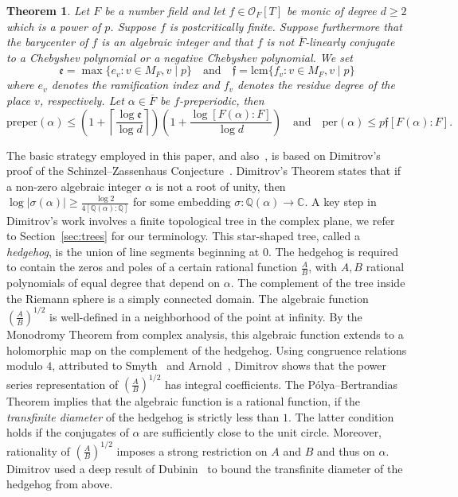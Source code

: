\documentclass[12pt,oneside,a4]{amsart}
\newcommand{\IC}{\mathbb{C}}
\newcommand{\IQ}{\mathbb{Q}}
\newcommand{\cO}{\mathcal{O}}
\newcounter{maincounter}
\numberwithin{maincounter}{section}
\numberwithin{equation}{section}
\newtheorem{theorem}[maincounter]{Theorem}
\begin{document}
\begin{theorem}
  \label{thm:intropreper}
  Let $F$ be a number field
  and let $f\in \cO_F[T]$ be monic of degree $d\ge 2$ which is a
  power of $p$.
  Suppose $f$ is postcritically finite. Suppose furthermore that the
  barycenter of $f$ is an algebraic integer and that $f$ is not
  $\overline F$-linearly conjugate to a Chebyshev polynomial or a
  negative Chebyshev polynomial.
  We set
  \begin{equation*}
    \mathfrak{e} = \max\{ e_v : v\in M_F, v\mid p\}\quad\text{and}\quad
    \mathfrak{f} =\mathrm{lcm}\{ f_v : v\in M_F, v\mid p\}
  \end{equation*}
   where $e_v$ denotes
  the ramification index and 
  $f_v$ denotes the residue degree of the place $v$, respectively.
  Let $\alpha\in \overline F$ be $f$-preperiodic, then 
  \begin{equation*}
    \mathrm{preper}(\alpha)\le
    \left(1+\left\lceil \frac{\log\mathfrak{e}}{\log d}\right\rceil\right)\left(1+\frac{\log[F(\alpha):F]}{\log
      d}\right)
    \quad\text{and}\quad
    \mathrm{per}(\alpha)\le p\mathfrak f[F(\alpha):F]. 
  \end{equation*}
\end{theorem}

The basic strategy employed in this paper, and
also~\cite{hs:2021lower}, is based on Dimitrov's proof of
the Schinzel--Zassenhaus Conjecture~\cite{dimitrov:SZ}. Dimitrov's
Theorem states that if a non-zero algebraic integer $\alpha$ is not a
root of unity, then $\log |\sigma(\alpha)|\ge \frac{\log 2}{4[\IQ(\alpha):\IQ]}$
for some embedding $\sigma\colon \IQ(\alpha)\rightarrow\IC$. 
A key step in Dimitrov's work  involves a finite topological tree in
the complex plane, we refer to Section~\ref{sec:trees} for our
terminology. 
This star-shaped tree, called a \textit{hedgehog}, is the
 union of line segments beginning at
$0$.
The hedgehog is required to contain the zeros and
poles of a certain rational function $\frac AB$, with $A,B$ rational
polynomials of equal degree that depend on $\alpha$.
The complement of the tree inside the
Riemann sphere is a simply connected domain. The algebraic function
$(\frac AB)^{1/2}$ is well-defined in a neighborhood of the point at
infinity. By the Monodromy Theorem  from complex analysis, this algebraic
function extends to a holomorphic map on the complement of the
hedgehog. Using congruence relations modulo $4$, attributed to
Smyth~\cite{smyth:coloringproof} and
Arnold~\cite{arnold:eulerfermat}, Dimitrov  shows that 
the power series representation of $(\frac AB)^{1/2}$ has integral
coefficients. The P\'olya--Bertrandias
Theorem  implies that the algebraic function is
a rational function, if the \textit{transfinite diameter} of the hedgehog is
strictly less than $1$.
The latter condition holds if the conjugates of $\alpha$ are
sufficiently close to the unit circle. Moreover, rationality of
$(\frac AB)^{1/2}$ imposes a strong restriction on $A$ and $B$ and
thus on $\alpha$.  Dimitrov used a deep result of   
Dubinin~\cite{Dubinin} to bound the transfinite diameter
of the hedgehog from above. 
\end{document}
